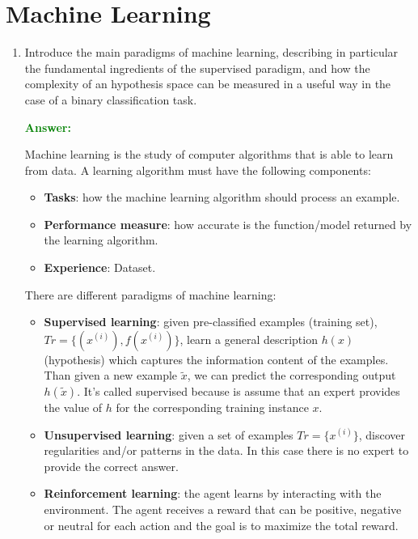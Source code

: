 \documentclass[12pt]{article}
\begin{document}
\section{Machine Learning}
\begin{enumerate}[label=\textbf{ML.\arabic*}]
    \item Introduce the main paradigms of machine learning, describing in particular the fundamental ingredients of the supervised paradigm, and how the complexity of an hypothesis space can be measured in a useful way in the case of a binary classification task.

    \textcolor{green}{\textbf{Answer:}}

    Machine learning is the study of computer algorithms that is able to learn from data.
    A learning algorithm must have the following components:
    \begin{itemize}
        \item \textbf{Tasks}: how the machine learning algorithm should process an example.
        \item \textbf{Performance measure}: how accurate is the function/model returned by the learning algorithm.
        \item \textbf{Experience}: Dataset.
    \end{itemize}
    There are different paradigms of machine learning:
    \begin{itemize}
        \item \textbf{Supervised learning}\label{q:ml-paradigms}: given pre-classified examples (training set), $Tr = \{(x^{(i)}),f(x^{(i)})\}$, learn a general description $h(x)$ (hypothesis) which captures the information content of the examples.
        Than given a new example $\tilde{x}$, we can predict the corresponding output $h(\tilde{x})$.
        It's called supervised because is assume that an expert provides the value of $h$ for the corresponding training instance $x$. 
        \item \textbf{Unsupervised learning}: given a set of examples $Tr = \{x^{(i)}\}$, discover regularities and/or patterns in the data.
        In this case there is no expert to provide the correct answer.
        \item \textbf{Reinforcement learning}: the agent learns by interacting with the environment.
        The agent receives a reward that can be positive, negative or neutral for each action and the goal is to maximize the total reward.
    \end{itemize}


\end{enumerate}
\end{document}
